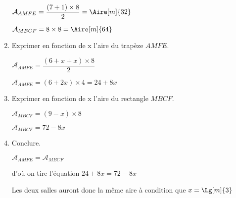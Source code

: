 \begin{corrige}
\begin{enumerate}
        {\color{red}$\mathcal{A}_{AMFE}=\dfrac{(7+1)\times 8}{2}=\Aire[m]{32}$
        
        $\mathcal{A}_{MBCF}=8\times 8=\Aire[m]{64}$}
        \item Exprimer en fonction de x l'aire du trapèze $AMFE$.
        
        {\color{red}
        $\mathcal{A}_{AMFE}=\dfrac{(6+x+x)\times 8}{2}$
        
        $\mathcal{A}_{AMFE}=(6+2x)\times4=24+8x$}
        \item Exprimer en fonction de x l'aire du rectangle $MBCF$.
        
        {\color{red}
        $\mathcal{A}_{MBCF}=(9-x)\times 8$
        
        $\mathcal{A}_{MBCF}=72-8x$}
        \item Conclure.
        
        {\color{red}$\mathcal{A}_{AMFE}=\mathcal{A}_{MBCF}$
        
        d'où on tire l'équation $24+8x=72-8x$
        
        
        Les deux salles auront donc la même aire à condition que $x=\Lg[m]{3}$}
    \end{enumerate}
\end{corrige}

